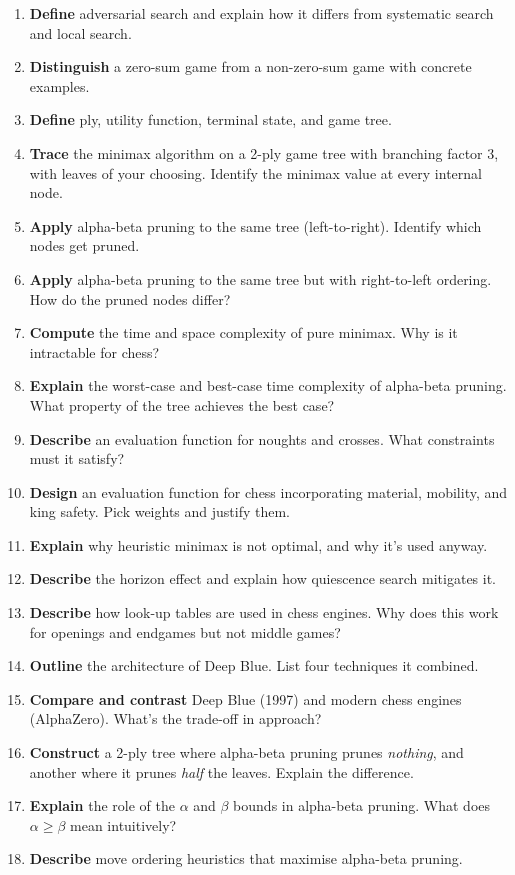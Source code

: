\documentclass[11pt, a4paper]{article}
\begin{document}
\begin{enumerate}
  \item \textbf{Define} adversarial search and explain how it differs from systematic search and local search.
  \item \textbf{Distinguish} a zero-sum game from a non-zero-sum game with concrete examples.
  \item \textbf{Define} ply, utility function, terminal state, and game tree.
  \item \textbf{Trace} the minimax algorithm on a 2-ply game tree with branching factor 3, with leaves of your choosing. Identify the minimax value at every internal node.
  \item \textbf{Apply} alpha-beta pruning to the same tree (left-to-right). Identify which nodes get pruned.
  \item \textbf{Apply} alpha-beta pruning to the same tree but with right-to-left ordering. How do the pruned nodes differ?
  \item \textbf{Compute} the time and space complexity of pure minimax. Why is it intractable for chess?
  \item \textbf{Explain} the worst-case and best-case time complexity of alpha-beta pruning. What property of the tree achieves the best case?
  \item \textbf{Describe} an evaluation function for noughts and crosses. What constraints must it satisfy?
  \item \textbf{Design} an evaluation function for chess incorporating material, mobility, and king safety. Pick weights and justify them.
  \item \textbf{Explain} why heuristic minimax is not optimal, and why it's used anyway.
  \item \textbf{Describe} the horizon effect and explain how quiescence search mitigates it.
  \item \textbf{Describe} how look-up tables are used in chess engines. Why does this work for openings and endgames but not middle games?
  \item \textbf{Outline} the architecture of Deep Blue. List four techniques it combined.
  \item \textbf{Compare and contrast} Deep Blue (1997) and modern chess engines (AlphaZero). What's the trade-off in approach?
  \item \textbf{Construct} a 2-ply tree where alpha-beta pruning prunes \emph{nothing}, and another where it prunes \emph{half} the leaves. Explain the difference.
  \item \textbf{Explain} the role of the $\alpha$ and $\beta$ bounds in alpha-beta pruning. What does $\alpha \ge \beta$ mean intuitively?
  \item \textbf{Describe} move ordering heuristics that maximise alpha-beta pruning.
\end{enumerate}
\end{document}
